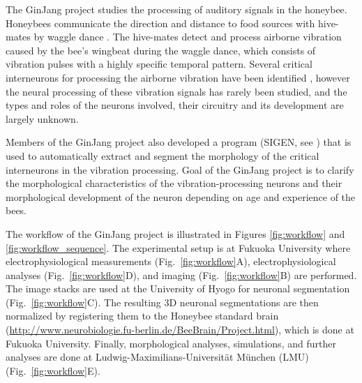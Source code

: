 \documentclass{frontiersSCNS} %
\begin{document}
The GinJang project studies the processing of auditory signals in the honeybee.
Honeybees communicate the direction and distance to food sources with
hive-mates by waggle dance \citep{Frisch1967}. The hive-mates detect and
process airborne vibration caused by the bee's wingbeat during the waggle
dance, which consists of vibration pulses with a highly specific temporal pattern.
Several critical interneurons for processing the airborne vibration
have been identified \citep{Ai2007, Ai2009, Ai2010, Ai2012, Ai2013}, however
the neural processing of these vibration signals has rarely been studied, and
the types and roles of the neurons involved, their circuitry and its
development are largely unknown.

Members of the GinJang project also developed a program (SIGEN, see
\citet{Minemoto}) that is used to automatically extract and segment the morphology of
the critical interneurons in the vibration processing. Goal of the GinJang
project is to clarify the morphological characteristics of the
vibration-processing neurons and their morphological development of the neuron
depending on age and experience of the bees.

The workflow of the GinJang project is illustrated in Figures
\ref{fig:workflow} and \ref{fig:workflow_sequence}.
The experimental setup
is at Fukuoka University where electrophysiological
measurements (Fig.~\ref{fig:workflow}A), electrophysiological analyses
(Fig.~\ref{fig:workflow}D), and imaging (Fig.~\ref{fig:workflow}B) are
performed. The image stacks are used at the University of Hyogo for
neuronal segmentation (Fig.~\ref{fig:workflow}C). The resulting 3D neuronal
segmentations are then normalized by registering them to the Honeybee standard
brain (\url{http://www.neurobiologie.fu-berlin.de/BeeBrain/Project.html}), which
is done at Fukuoka University. Finally, morphological analyses, simulations,
and further analyses are done at Ludwig-Maximilians-Universität München (LMU)
(Fig.~\ref{fig:workflow}E).
\end{document}
